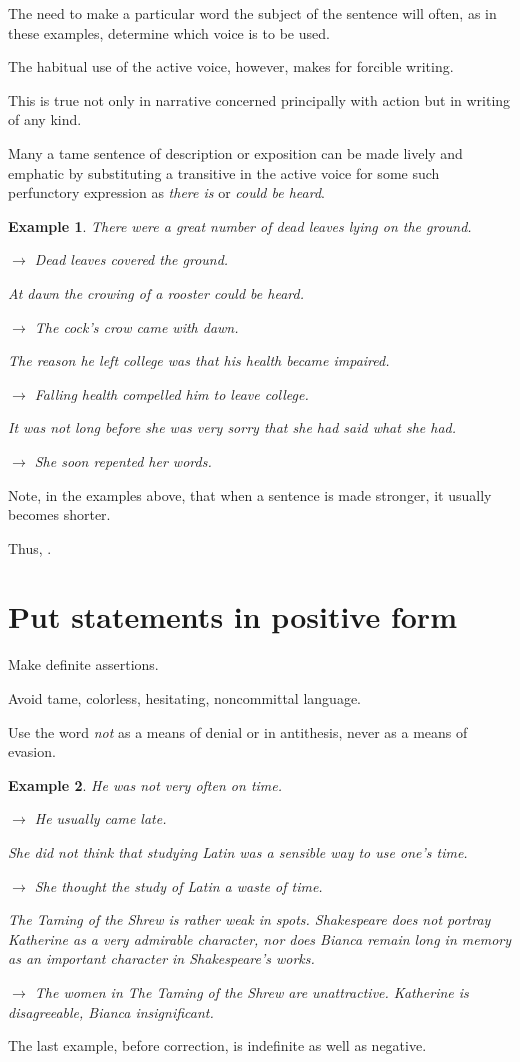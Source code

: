 \documentclass{book}
\numberwithin{equation}{section}
\newtheorem{example}{Example}[chapter]
\begin{document}
The need to make a particular word the subject of the sentence will often, as in these examples, determine which voice is to be used.

%
The habitual use of the active voice, however, makes for forcible writing.

This is true not only in narrative concerned principally with action but in writing of any kind.

Many a tame sentence of description or exposition can be made lively and emphatic by substituting a transitive in the active voice for some such perfunctory expression as \textit{there is} or \textit{could be heard}.
\begin{example}
    There were a great number of dead leaves lying on the ground.
    
    $\to$ Dead leaves covered the ground.
    
    At dawn the crowing of a rooster could be heard.
    
    $\to$ The cock's crow came with dawn.
    
    The reason he left college was that his health became impaired.
    
    $\to$ Falling health compelled him to leave college.
    
    It was not long before she was very sorry that she had said what she had.
    
    $\to$ She soon repented her words.
\end{example}
Note, in the examples above, that when a sentence is made stronger, it usually becomes shorter.

Thus, .

\section{Put statements in positive form}
Make definite assertions.

Avoid tame, colorless, hesitating, noncommittal language.

Use the word \textit{not} as a means of denial or in antithesis, never as a means of evasion.
\begin{example}
    He was not very often on time.
    
    $\to$ He usually came late.
    
    She did not think that studying Latin was a sensible way to use one's time.
    
    $\to$ She thought the study of Latin a waste of time.
    
    \emph{The Taming of the Shrew} is rather weak in spots. Shakespeare does not portray Katherine as a very admirable character, nor does Bianca remain long in memory as an important character in Shakespeare's works.
    
    $\to$ The women in \emph{The Taming of the Shrew} are unattractive. Katherine is disagreeable, Bianca insignificant.
\end{example}
The last example, before correction, is indefinite as well as negative.
\end{document}

